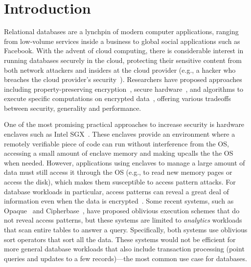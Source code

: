 \documentclass[letterpaper,twocolumn,10pt]{article}
\begin{document}
\section{Introduction}

Relational databases are a lynchpin of modern computer applications, ranging from low-volume services inside a business to global social applications such as Facebook.
With the advent of cloud computing, there is considerable interest in running databases securely in the cloud, protecting their sensitive content from both network attackers and insiders at the cloud provider (e.g., a hacker who breaches the cloud provider's security~\cite{yahoo-hack}).
Researchers have proposed approaches including property-preserving encryption~\cite{PRZB12,mylar,FVY+17}, secure hardware~\cite{cipherbase,ZDB+17}, and algorithms to execute specific computations on encrypted data~\cite{WZPM16,NWI+13}, offering various tradeoffs between security, generality and performance.

One of the most promising practical approaches to increase security is hardware enclaves such as Intel SGX~\cite{CD16}.
These enclaves provide an environment where a remotely verifiable piece of code can run without interference from the OS, accessing a small amount of enclave memory and making upcalls the the OS when needed.
However, applications using enclaves to manage a large amount of data must still access it through the OS (e.g., to read new memory pages or access the disk), which makes them susceptible to access pattern attacks.
For database workloads in particular, access patterns can reveal a great deal of information even when the data is encrypted~\cite{IKK12,NKW15,CGPR15}. %
Some recent systems, such as Opaque~\cite{ZDB+17} and Cipherbase~\cite{cipherbase}, have proposed oblivious execution schemes that do not reveal access patterns, but these systems are limited to \emph{analytics} workloads that scan entire tables to answer a query.
Specifically, both systems use oblivious sort operators that sort all the data.
These systems would not be efficient for more general database workloads that also include transaction processing (point queries and updates to a few records)---the most common use case for databases.
\end{document}
